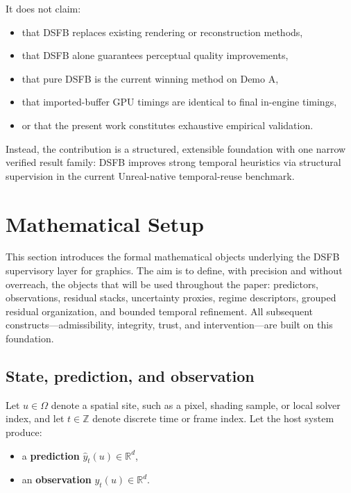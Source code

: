 \documentclass[11pt]{article}
\theoremstyle{definition}
\theoremstyle{plain}
\begin{document}
It does not claim:
\begin{itemize}[leftmargin=1.5em]
    \item that DSFB replaces existing rendering or reconstruction methods,
    \item that DSFB alone guarantees perceptual quality improvements,
    \item that pure DSFB is the current winning method on Demo A,
    \item that imported-buffer GPU timings are identical to final in-engine timings,
    \item or that the present work constitutes exhaustive empirical validation.
\end{itemize}

Instead, the contribution is a structured, extensible foundation with one narrow verified result family: DSFB improves strong temporal heuristics via structural supervision in the current Unreal-native temporal-reuse benchmark.


\section{Mathematical Setup}
\label{sec:mathsetup}

This section introduces the formal mathematical objects underlying the DSFB supervisory layer for graphics. The aim is to define, with precision and without overreach, the objects that will be used throughout the paper: predictors, observations, residual stacks, uncertainty proxies, regime descriptors, grouped residual organization, and bounded temporal refinement. All subsequent constructs—admissibility, integrity, trust, and intervention—are built on this foundation.


\subsection{State, prediction, and observation}

Let $u \in \Omega$ denote a spatial site, such as a pixel, shading sample, or local solver index, and let $t \in \mathbb{Z}$ denote discrete time or frame index. Let the host system produce:
\begin{itemize}[leftmargin=1.5em]
    \item a \textbf{prediction} $\hat y_t(u) \in \mathbb{R}^d$,
    \item an \textbf{observation} $y_t(u) \in \mathbb{R}^d$.
\end{itemize}
\end{document}
